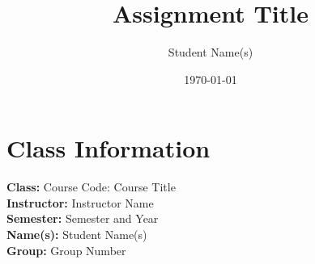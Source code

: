 \documentclass[12pt]{article}
\begin{document}
\title{Assignment Title} %
\author{Student Name(s)} %
\date{\today} %
\maketitle %



\section*{Class Information}
\textbf{Class:} Course Code: Course Title \\ %
\textbf{Instructor:} Instructor Name \\ %
\textbf{Semester:} Semester and Year \\ %
\textbf{Name(s):} Student Name(s) \\ %
\textbf{Group:} Group Number %

\newpage
{} %
\setcounter{page}{1} %
\tableofcontents %
\end{document}
